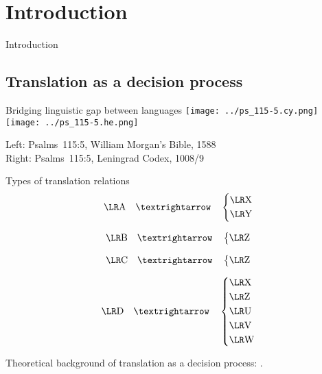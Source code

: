\setcounter{section}{-1}
\section{Introduction}

\begin{frame}{}
	\begin{center}
		Introduction
	\end{center}
\end{frame}



\subsection{Translation as a decision process}

\begin{frame}{Bridging linguistic gap between languages}
	\texttt{[image: ../ps\_115-5.cy.png]}
	\hfill
	\texttt{[image: ../ps\_115-5.he.png]}

	\vfill

	Left: Psalms~115:5, William Morgan’s Bible, 1588\\
	Right: Psalms~115:5, Leningrad Codex, 1008/9
\end{frame}



\begin{frame}{\hopoint Types of translation relations}
	$$
	\mtext{A} \transto
	\begin{dcases}
		\mtext{X}\\
		\mtext{Y}
	\end{dcases}
	$$

	$$
	\mtext{B} \transto
	\begin{dcases}
		\mtext{Z}
	\end{dcases}
	$$

	$$
	\mtext{C} \transto
	\begin{dcases}
		\mtext{Z}
	\end{dcases}
	$$

	$$
	\mtext{D} \transto
	\begin{dcases}
		\mtext{X}\\
		\mtext{Z}\\
		\mtext{U}\\
		\mtext{V}\\
		\mtext{W}
	\end{dcases}
	$$

	{\footnotesize Theoretical background of translation as a decision process: \cite{levy.j:1967:translation}.}
\end{frame}



